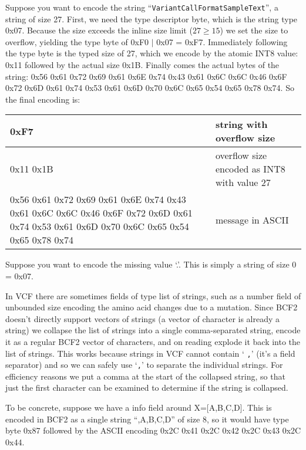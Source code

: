 \documentclass[8pt]{article}
\begin{document}
Suppose you want to encode the string ``{\tt VariantCallFormatSampleText}'', a string of size 27.  First, we need the type descriptor byte, which is the string type 0x07.  Because the size exceeds the inline size limit ($27 \geq 15$) we set the size to overflow, yielding the type byte of 0xF0 $|$ 0x07 = 0xF7.  Immediately following the type byte is the typed size of 27, which we encode by the atomic INT8 value: 0x11 followed by the actual size 0x1B.  Finally comes the actual bytes of the string: 0x56 0x61 0x72 0x69 0x61 0x6E 0x74 0x43 0x61 0x6C 0x6C 0x46 0x6F 0x72 0x6D 0x61 0x74 0x53 0x61 0x6D 0x70 0x6C 0x65 0x54 0x65 0x78 0x74.  So the final encoding is:

\vspace{0.3cm}
\begin{tabular}{ | p{9cm} | p{6cm} | } \hline
0xF7 & string with overflow size \\ \hline
0x11 0x1B & overflow size encoded as INT8 with value 27 \\ \hline
0x56 0x61 0x72 0x69 0x61 0x6E 0x74 0x43 0x61 0x6C 0x6C 0x46 0x6F 0x72 0x6D 0x61 0x74 0x53 0x61 0x6D 0x70 0x6C 0x65 0x54 0x65 0x78 0x74 & message in ASCII \\ \hline
\end{tabular}
\vspace{0.3cm}

Suppose you want to encode the missing value `.'.  This is simply a string of size 0 = 0x07.

\vspace{0.3cm}
In VCF there are sometimes fields of type list of strings, such as a number field of unbounded size encoding the amino acid changes due to a mutation.  Since BCF2 doesn't directly support vectors of strings (a vector of character is already a string) we collapse the list of strings into a single comma-separated string, encode it as a regular BCF2 vector of characters, and on reading explode it back into the list of strings.  This works because strings in VCF cannot contain `{
\tt ,}' (it's a field separator) and so we can safely use `{\tt ,}' to separate the individual strings.  For efficiency reasons we put a comma at the start of the collapsed string, so that just the first character can be examined to determine if the string is collapsed.

To be concrete, suppose we have a info field around X=[A,B,C,D].  This is encoded in BCF2 as a single string ``,A,B,C,D'' of size 8, so it would have type byte 0x87 followed by the ASCII encoding 0x2C 0x41 0x2C 0x42 0x2C 0x43 0x2C 0x44.
\end{document}
